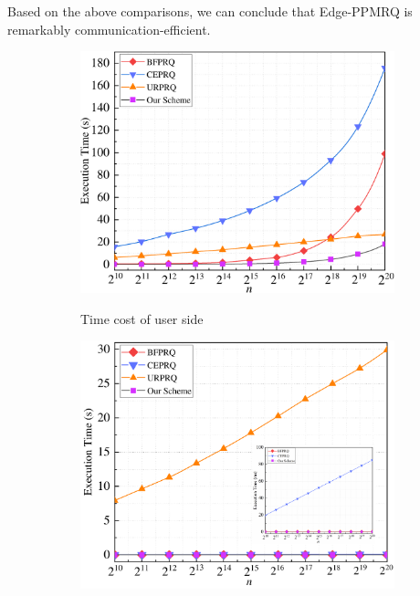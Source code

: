 \documentclass[IEEE JOURNAL OF BIOMEDICAL AND HEALTH INFORMATICS]{IEEEtran}
\begin{document}
 


  
  Based on the above comparisons, we can conclude that Edge-PPMRQ is remarkably communication-efficient.



\begin{figure}	
	\centering
	\begin{subfigure}[t]{0.3\textwidth}
		\centering	
		\includegraphics[width=1\textwidth]{com_1n}\\
		\caption{Time cost of user side}
		\label{com_1n}
	\end{subfigure}
	\quad
	\begin{subfigure}[t]{0.3\textwidth}
		\centering
		\includegraphics[width=1\textwidth]{com_2n_12}\\

\end{subfigure}
\end{figure}
\end{document}
